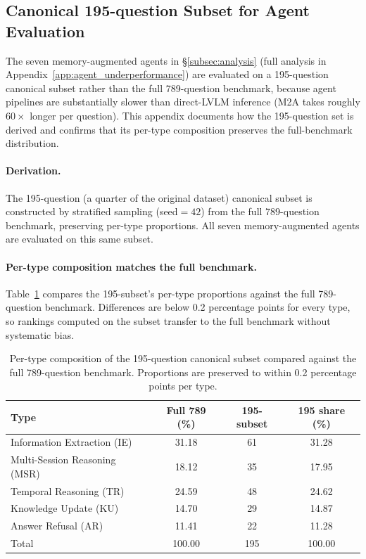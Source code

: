 \documentclass{llmxive}
\begin{document}
\subsection{Canonical 195-question Subset for Agent Evaluation}
\label{app:canonical195}

The seven memory-augmented agents in \S\ref{subsec:analysis} (full analysis in Appendix~\ref{app:agent_underperformance}) are evaluated on a 195-question canonical subset rather than the full 789-question benchmark, because agent pipelines are substantially slower than direct-LVLM inference (M2A takes roughly $60{\times}$ longer per question). This appendix documents how the 195-question set is derived and confirms that its per-type composition preserves the full-benchmark distribution.

\paragraph{Derivation.}
The 195-question (a quarter of the original dataset) canonical subset is constructed by stratified sampling (seed${=}42$) from the full 789-question benchmark, preserving per-type proportions. All seven memory-augmented agents are evaluated on this same subset.

\paragraph{Per-type composition matches the full benchmark.}
Table~\ref{tab:canonical195_strat} compares the 195-subset's per-type proportions against the full 789-question benchmark. Differences are below 0.2 percentage points for every type, so rankings computed on the subset transfer to the full benchmark without systematic bias.

\begin{table}[!htbp]
\centering
\small
\begin{tabular}{@{}lccc@{}}
\toprule
Type & Full 789 (\%) & 195-subset & 195 share (\%) \\
\midrule
Information Extraction (IE)      & 31.18 & 61 & 31.28 \\
Multi-Session Reasoning (MSR)    & 18.12 & 35 & 17.95 \\
Temporal Reasoning (TR)          & 24.59 & 48 & 24.62 \\
Knowledge Update (KU)            & 14.70 & 29 & 14.87 \\
Answer Refusal (AR)              & 11.41 & 22 & 11.28 \\
\midrule
Total                            & 100.00 & 195 & 100.00 \\
\bottomrule
\end{tabular}
\caption{Per-type composition of the 195-question canonical subset compared against the full 789-question benchmark. Proportions are preserved to within 0.2 percentage points per type.}
\label{tab:canonical195_strat}
\end{table}
\end{document}
